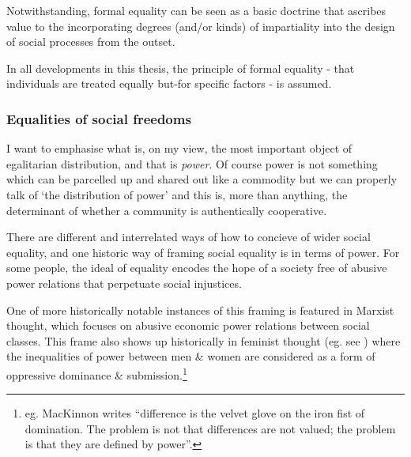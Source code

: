 Notwithstanding, formal equality can be seen as a basic doctrine that ascribes value to the incorporating degrees (and/or kinds) of impartiality into the design of social processes from the outset.%

In all developments in this thesis, the principle of formal equality - that individuals are treated equally but-for specific factors - is assumed.

\subsubsection{Equalities of social freedoms}

\begin{displayquote}
I want to emphasise what is, on my view, the most important object of egalitarian distribution, and that is \textit{power}. Of course power is not something which can be parcelled up and shared out like a commodity but we can properly talk of `the distribution of power' and this is, more than anything, the determinant of whether a community is authentically cooperative.\cite{TheSocialBasisofEquality:1998}
\end{displayquote}

There are different and interrelated ways of how to concieve of wider social equality, and one historic way of framing social equality is in terms of power.
For some people, the ideal of equality encodes the hope of a society free of abusive power relations that perpetuate social injustices.

One of more historically notable instances of this framing is featured in Marxist thought, which focuses on abusive economic power relations between social classes. This frame also shows up historically in feminist thought (eg. see \cite{Cudd2006-CUDAO}) where the inequalities of power between men \& women are considered as a form of oppressive dominance \& submission.\footnote{eg. MacKinnon writes ``difference is the velvet glove on the iron fist of domination. The problem is not that differences are not valued; the problem is that they are defined by power''\cite{mackinnon1989toward}.}

